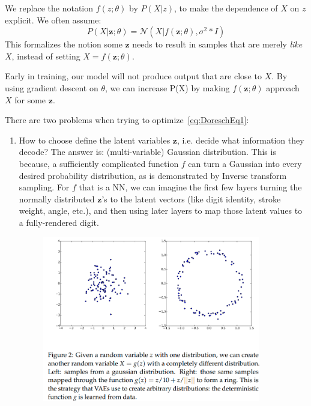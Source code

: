 \documentclass{article}
\begin{document}
We replace the notation $f(z ; \theta)$ by $P(X|z)$, to make the dependence of $X$ on $z$ explicit. 
We often assume:
\begin{equation} \label{eq:DoreschEq1}
  P(X | \bm{z} ; \theta) = \mathcal{N}(X | f(\bm{z} ; \theta), \sigma ^2 * I)
\end{equation}
This formalizes the notion some $\bm{z}$ needs to result in samples that are merely \textit{like} $X$, instead of setting $X = f( \bm{z} ; \theta)$. 

Early in training, our model will not produce output that are close to $X$. By using gradient descent on $\theta$, we can increase P(X) by making $f(\bm{z} ; \theta)$ approach $X$ for some $\bm{z}$. 

There are two problems when trying to optimize~\cref{eq:DoreschEq1}:
\begin{enumerate}

  \item How to choose define the latent variables $\bm{z}$, i.e. decide what information they decode? The answer is: (multi-variable) Gaussian distribution. 
  This is because, a sufficiently complicated function $f$ can turn a Gaussian into every desired probability distribution, as is demonstrated by Inverse transform sampling. 
  For $f$ that is a  NN, we can imagine the first few layers turning the normally distributed $\bm{z}$'s to the latent vectors (like digit identity, stroke weight, angle, etc.), and then using later layers to map those latent values to a fully-rendered digit. 
\begin{figure}[H] \centering \includegraphics[height=0.3\textheight,width=0.9\textwidth,keepaspectratio]{inverseTransformSampling}   \end{figure}


\end{enumerate}
\end{document}
